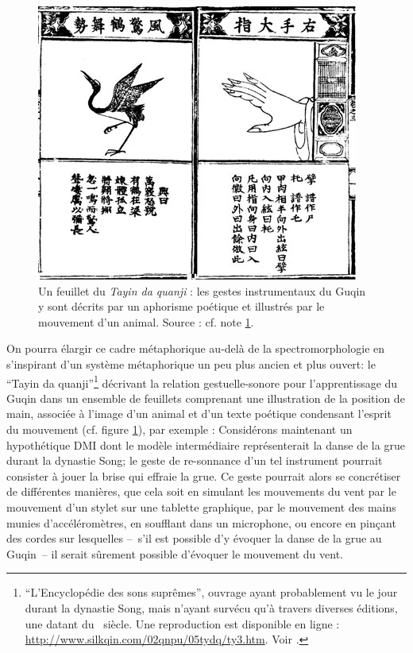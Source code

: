 \begin{figure}[!t]
	\captionsetup{format=plain}%
	\includegraphics[width=\textwidth]{gfx/03_gesture/Guqin-hand01w.jpg}
	\caption[Le Tayin da quanji : métaphore poétique et animale dans la pédagogie du Guqin]{Un feuillet du \textit{Tayin da quanji} : les gestes instrumentaux du Guqin y sont décrits par un aphorisme poétique et illustrés par le mouvement d'un animal. Source : cf. note \ref{fn:guqin}.}
	\label{fig:gesture:guqin}
\end{figure}
\indent On pourra élargir ce cadre métaphorique au-delà de la spectromorphologie en s'inspirant d'un système métaphorique un peu plus ancien et plus ouvert: le ``Tayin da quanji''\footnote{\label{fn:guqin}``L’Encyclopédie des sons suprêmes'', ouvrage ayant probablement vu le jour durant la dynastie Song, mais n'ayant survécu qu'à travers diverses éditions, une datant du ~siècle. Une reproduction est disponible en ligne : \url{http://www.silkqin.com/02qnpu/05tydq/ty3.htm}. Voir \cite{picard_chine:_1991}.} décrivant la relation gestuelle-sonore pour l'apprentissage du Guqin dans un ensemble de feuillets comprenant une illustration de la position de main, associée à l'image d'un animal et d'un texte poétique condensant l'esprit du mouvement (cf. figure \ref{fig:gesture:guqin}), par exemple :  Considérons maintenant un hypothétique \gls{DMI} dont le modèle intermédiaire représenterait la danse de la grue durant la dynastie Song; le geste de re-sonnance d'un tel instrument pourrait consister à jouer la brise qui effraie la grue. Ce geste pourrait alors se concrétiser de différentes manières, que cela soit en simulant les mouvements du vent par le mouvement d'un stylet sur une tablette graphique, par le mouvement des mains munies d'accéléromètres, en soufflant dans un microphone, ou encore en pinçant des cordes sur lesquelles --~s'il est possible d'y évoquer la danse de la grue au Guqin~-- il serait sûrement possible d'évoquer le mouvement du vent.

